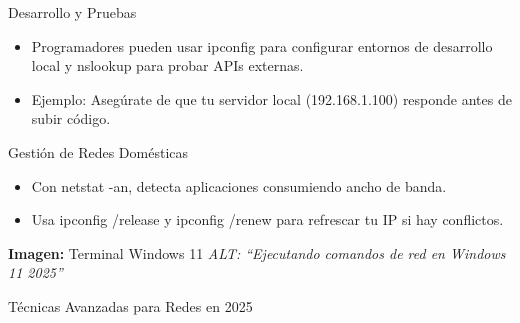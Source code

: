 \documentclass[
  doc,
  floatsintext,
  longtable,
  a4paper,
  nolmodern,
  notxfonts,
  notimes,
  colorlinks=true,linkcolor=blue,citecolor=blue,urlcolor=blue]{apa7}
\providecommand{\tightlist}{%
  \setlength{\itemsep}{0pt}\setlength{\parskip}{0pt}}
\begin{document}
Desarrollo y Pruebas

\begin{itemize}
\tightlist
\item
  Programadores pueden usar ipconfig para configurar entornos de
  desarrollo local y nslookup para probar APIs externas.
\item
  Ejemplo: Asegúrate de que tu servidor local (192.168.1.100) responde
  antes de subir código.
\end{itemize}

Gestión de Redes Domésticas

\begin{itemize}
\tightlist
\item
  Con netstat -an, detecta aplicaciones consumiendo ancho de banda.
\item
  Usa ipconfig /release y ipconfig /renew para refrescar tu IP si hay
  conflictos.
\end{itemize}

\textbf{Imagen:} Terminal Windows 11 \emph{ALT: ``Ejecutando comandos de
red en Windows 11 2025''}

Técnicas Avanzadas para Redes en 2025
\end{document}
